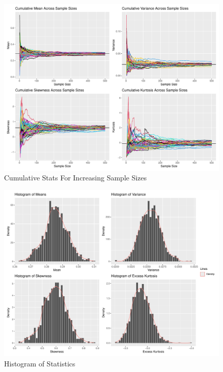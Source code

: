 \documentclass{article}\usepackage[]{graphicx}\usepackage[]{xcolor}
\makeatletter
\def\maxwidth{ %
  \ifdim\Gin@nat@width>\linewidth
    \linewidth
  \else
    \Gin@nat@width
  \fi
}
\newenvironment{knitrout}{}{} %
\makeatother
\begin{document}
\begin{figure}[H]
\begin{center}
\begin{knitrout}
\color{fgcolor}

{\centering \includegraphics[width=\maxwidth]{figure/unnamed-chunk-10-1} 

}


\end{knitrout}
\caption{Cumulative Stats For Increasing Sample Sizes}
\label{plot3} 
\end{center}
\end{figure}


\begin{figure}[H]
\begin{center}
\begin{knitrout}
\color{fgcolor}

{\centering \includegraphics[width=\maxwidth]{figure/unnamed-chunk-11-1} 

}


\end{knitrout}
\caption{Histogram of Statistics}
\label{plot4} 
\end{center}
\end{figure}
\end{document}
